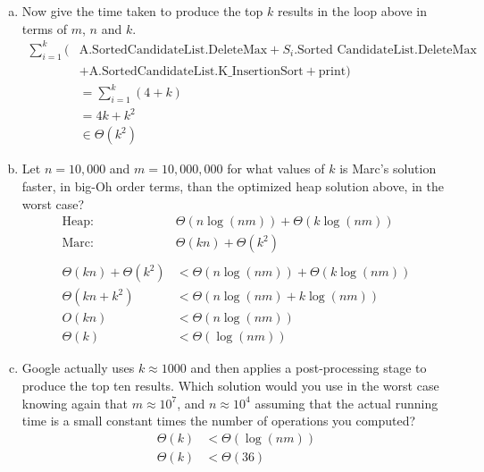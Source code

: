 \documentclass[12pt]{article}
\begin{document}
\begin{enumerate}[(a)]
\item  Now give the time taken 
to produce the top $k$ results in the loop above in terms of $m$, $n$ and $k$.
\begin{align*}
\displaystyle\sum_{i=1}^k \bigg (& \text{A.SortedCandidateList.DeleteMax} + \text{$S_i$.Sorted CandidateList.DeleteMax} \\ &+ \text{A.SortedCandidateList.K\_InsertionSort} + \text{print} \bigg )\\
&= \displaystyle\sum_{i=1}^k (4+k)\\
&= 4k + k^2\\
&\in \Theta(k^2)
\end{align*}
\item Let $n=10,000$ and $m=10,000,000$ for what values of $k$ is Marc's solution faster, in big-Oh order terms, than the optimized
heap solution above, in the worst case?
\begin{align*}
\text{Heap: }& \Theta(n\log(nm)) + \Theta(k\log(nm))\\
\text{Marc: }& \Theta(kn) + \Theta(k^2)\\\\
\Theta(kn) + \Theta(k^2) & < \Theta(n\log(nm)) + \Theta(k\log(nm))\\
\Theta(kn + k^2) &< \Theta(n\log(nm) + k\log(nm))\\
O(kn) &< \Theta(n\log(nm))\\
\Theta(k) &< \Theta(\log(nm))\end{align*}
\item Google actually uses $k\approx 1000$ and then applies a post-processing stage to produce the top ten
results. Which solution would you use in the worst case knowing again that $m\approx 10^7$, and $n\approx 10^4$ assuming that the actual
running time is a small constant times the number of operations you computed?\\
\begin{align*} 
\Theta(k) &< \Theta(\log(nm))\\
\Theta(k) &< \Theta(36)
\end{align*} 
\end{enumerate}
\end{document}

